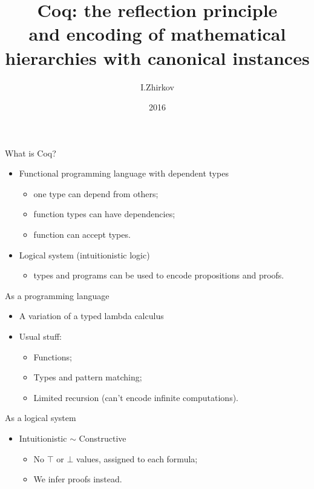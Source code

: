 \documentclass{beamer}
\title{Coq: the reflection principle\\and encoding of mathematical hierarchies with canonical instances}
\author{I.Zhirkov}
\date{2016}
\begin{document}
\begin{frame}
    \titlepage
\end{frame}


\begin{frame}{What is Coq?}
    \begin{itemize}
        \item Functional programming language with dependent types
            \pause
            \begin{itemize}
                \item one type can depend from others;
                \item function types can have dependencies;
                \item function can accept types.
            \end{itemize}
            \pause
        \item Logical system (intuitionistic logic)
            \begin{itemize}
                \item types and programs can be used to encode propositions and
                    proofs. 
            \end{itemize}
    \end{itemize}
\end{frame}

\begin{frame}{As a programming language}
    \begin{itemize}
        \item A variation of a typed lambda calculus
        \item Usual stuff:
            \begin{itemize}
                \item Functions;
                \item Types and pattern matching;
                \item Limited recursion (can't encode infinite computations).
            \end{itemize}
    \end{itemize}
\end{frame}


\begin{frame}{As a logical system}
    
\begin{itemize}
    \item Intuitionistic $\sim$ Constructive
        \begin{itemize}
            \item No $\top$ or $\bot$ values, assigned to each formula;
            \item We infer proofs instead.
        \end{itemize}
    \end{itemize}
\end{frame}
\end{document}
